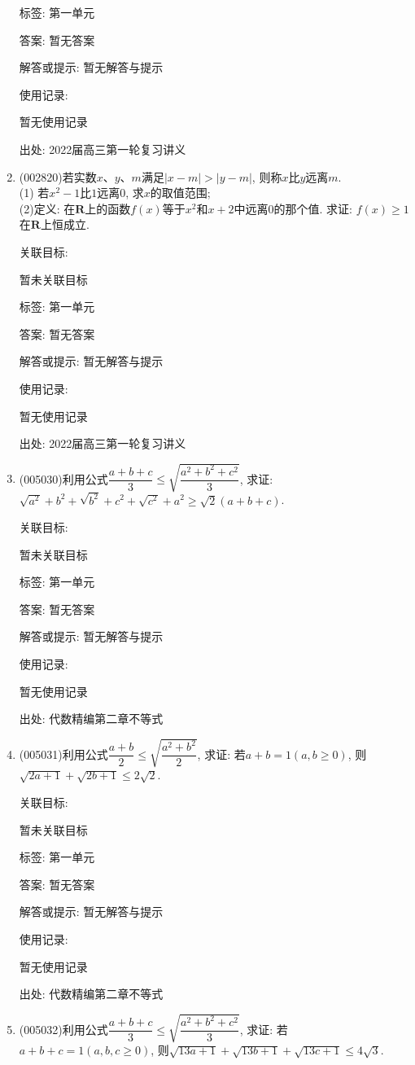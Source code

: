 \documentclass[10pt,a4paper]{article}
\begin{document}
\begin{enumerate}[1.]
标签: 第一单元

答案: 暂无答案

解答或提示: 暂无解答与提示

使用记录:

暂无使用记录


出处: 2022届高三第一轮复习讲义
\item { (002820)}若实数$x$、$y$、$m$满足$|x-m|>|y-m|$, 则称$x$比$y$远离$m$.\\
(1) 若$x^2-1$比$1$远离$0$, 求$x$的取值范围;\\
(2)定义: 在$\mathbf{R}$上的函数$f(x)$等于$x^2$和$x+2$中远离$0$的那个值. 求证: $f(x)\ge 1$在$\mathbf{R}$上恒成立.


关联目标:

暂未关联目标



标签: 第一单元

答案: 暂无答案

解答或提示: 暂无解答与提示

使用记录:

暂无使用记录


出处: 2022届高三第一轮复习讲义
\item { (005030)}利用公式$\dfrac{a+b+c}3\le \sqrt{\dfrac{a^2+b^2+c^2}3}$, 求证: $\sqrt{a^2}+{b^2}+\sqrt{b^2}+{c^2}+\sqrt{c^2}+{a^2}\ge \sqrt 2(a+b+c)$.


关联目标:

暂未关联目标



标签: 第一单元

答案: 暂无答案

解答或提示: 暂无解答与提示

使用记录:

暂无使用记录


出处: 代数精编第二章不等式
\item { (005031)}利用公式$\dfrac{a+b}2\le \sqrt{\dfrac{a^2+b^2}2}$, 求证: 若$a+b=1(a,b\ge 0)$, 则$\sqrt{2a+1}+\sqrt{2b+1}\le 2\sqrt 2$.


关联目标:

暂未关联目标



标签: 第一单元

答案: 暂无答案

解答或提示: 暂无解答与提示

使用记录:

暂无使用记录


出处: 代数精编第二章不等式
\item { (005032)}利用公式$\dfrac{a+b+c}3\le \sqrt{\dfrac{a^2+b^2+c^2}3}$, 求证: 若$a+b+c=1(a,b,c\ge 0)$, 则$\sqrt{13a+1}+\sqrt{13b+1}+\sqrt{13c+1}\le 4\sqrt 3$.



\end{enumerate}
\end{document}
